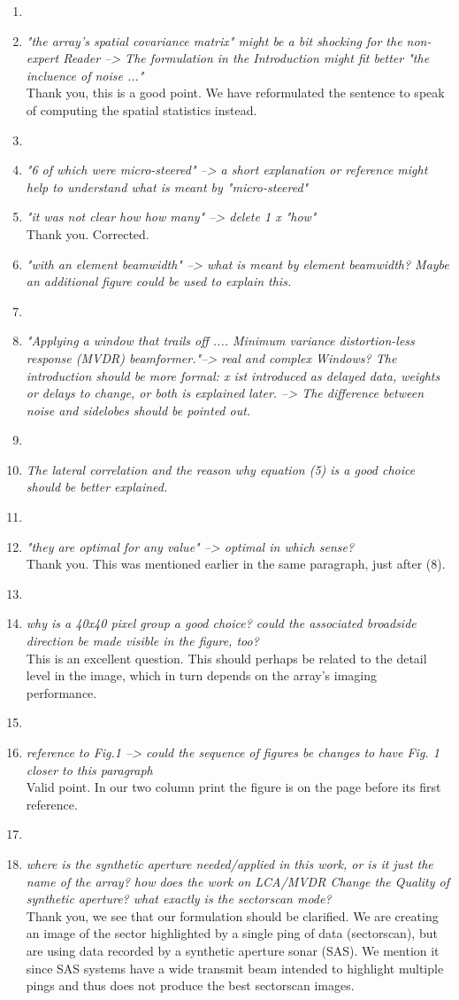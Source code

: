 \documentclass[11pt]{article} %
\newcommand\1{\vec 1}
\newcommand\q[1]{\textit{#1}}
\newcommand\qi[1]{\item\q{#1}}
\newcommand\hi[1]{\item[\textbf{#1}]}
\newcommand\ans[1]{#1}
\newcommand\ai[1]{\\[.5\baselineskip]\ans{#1}}
\begin{document}
\begin{enumerate}
\hi{Abstract}
\qi{"the array's spatial covariance matrix" might be a bit shocking for the non-expert Reader --> The formulation in the Introduction might fit better "the incluence of noise ..."}
\ai{Thank you, this is a good point. We have reformulated the sentence to speak of computing the spatial statistics instead.}
%
\hi{Page 2}
\qi{"6 of which were micro-steered" --> a short explanation or reference might help to understand what is meant by "micro-steered"}
\ai{}
%
\qi{"it was not clear how how many" --> delete 1 x "how"}
\ai{Thank you. Corrected.}
%
\qi{"with an element beamwidth" --> what is meant by element beamwidth? Maybe an additional figure could be used to explain this.}
\ai{}
%
\hi{Page 3, after (1)}
\qi{"Applying a window that trails off .... Minimum variance distortion-less response (MVDR) beamformer."--> real and complex Windows? The introduction should be more formal: x ist introduced as delayed data, weights or delays to change, or both is explained later. --> The difference between noise and sidelobes should be pointed out.}
\ai{}
%
\hi{Page 5, equation (5)}
\qi{The lateral correlation and the reason why equation (5) is a good choice should be better explained.}
\ai{}
%
\hi{Page 6, last row}
\qi{"they are optimal for any value" --> optimal in which sense?}
\ai{Thank you. This was mentioned earlier in the same paragraph, just after (8).}
%
\hi{Fig 3}
\qi{why is a 40x40 pixel group a good choice? could the associated broadside direction be made visible in the figure, too?}
\ai{This is an excellent question. This should perhaps be related to the detail level in the image, which in turn depends on the array's imaging performance.}
%
\hi{Page 8}
\qi{reference to Fig.1 --> could the sequence of figures be changes to have Fig. 1 closer to this paragraph}
\ai{Valid point. In our two column print the figure is on the page before its first reference. }
%
\hi{Page 11}
\qi{where is the synthetic aperture needed/applied in this work, or is it just the name of the array? how does the work on LCA/MVDR Change the Quality of synthetic aperture?
what exactly is the sectorscan mode?}
\ai{Thank you, we see that our formulation should be clarified. We are creating an image of the sector highlighted by a single ping of data (sectorscan), but are using data recorded by a synthetic aperture sonar (SAS). We mention it since SAS systems have a wide transmit beam intended to highlight multiple pings and thus does not produce the best sectorscan images.}
%
\end{enumerate}
\end{document}
